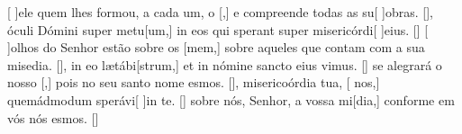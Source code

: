 {    {[ ]{e}le quem lhes formou, a cada um, o [,] e compreende todas as su[ ]{o}bras. [\LinkPT]},
  { óculi Dómini super metu[um,] in eos qui sperant super misericórdi[ ]{e}ius. [\LinkLA]}%
    {[ ]{o}lhos do Senhor estão sobre os [mem,] sobre aqueles que contam com a sua misedia. [\LinkPT]},
  { in eo lætábi[strum,] et in nómine sancto eius vimus. [\LinkLA]}%
    { se alegrará o nosso [,] pois no seu santo nome esmos. [\LinkPT]},
  { misericoórdia tua, [ nos,] quemádmodum sperávi[ ]{in} te. [\LinkLA]}%
    { sobre nós, Senhor, a vossa mi[dia,] conforme em vós nós esmos. [\LinkPT]}
}